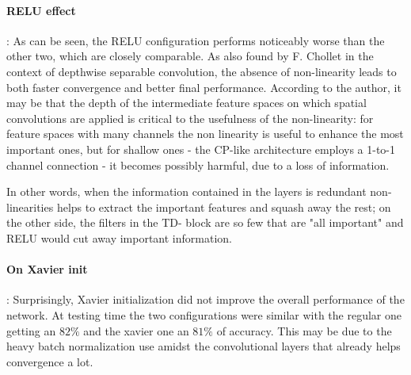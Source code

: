 \paragraph{RELU effect}: 
As can be seen, the RELU configuration performs noticeably worse than the other two, which are closely comparable. 
As also found by F. Chollet in the context of depthwise separable convolution\parencite{chollet}, the absence of non-linearity leads to both faster convergence and better final performance. According to the author, it may be that the depth of the intermediate feature spaces on which spatial convolutions are applied is critical to the usefulness of the non-linearity: for feature spaces with many channels the non linearity is useful to enhance the most important ones, but for shallow ones - the CP-like architecture employs a 1-to-1 channel connection - it becomes possibly harmful, due to a loss of information. 

In other words, when the information contained in the layers is redundant non-linearities helps to extract the important features and squash away the rest; on the other side, the filters in the TD- block are so few that are "all important" and RELU would cut away important information. 

\paragraph{On Xavier init}: 
Surprisingly, Xavier initialization did not improve the overall performance of the network. At testing time the two configurations were similar with the regular one getting an $82\%$ and the xavier one an $81\%$ of accuracy. This may be due to the heavy batch normalization use amidst the convolutional layers that already helps convergence a lot. \\



